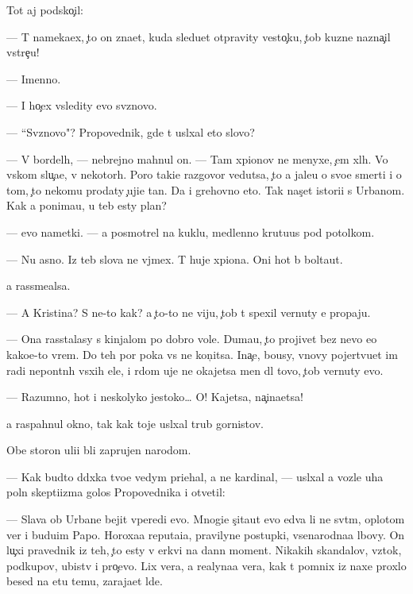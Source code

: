 \documentclass[10pt]{book}
\begin{document}
Tot aj podsko{\c}il:

— T{\yi} nameka{\y}ex, {\c}to on zna{\y}et, kuda sledu{\y}et otpravity vesto{\c}ku, {\c}tob{\yi} kuzne{\q} nazna{\c}il vstre{\c}u!

— Imenno.

— I ho{\c}ex v{\yi}sledity {\y}evo sv{\ia}znovo.

— ``Sv{\ia}znovo"? Propovednik, gde t{\yi} usl{\yi}xal eto slovo?

— V bordel{\ia}h, — nebrejno mahnul on. — Tam xpionov ne menyxe, {\c}em xl{\iu}h. Vo vs{\ia}kom slu{\c}a{\y}e, v nekotor{\yi}h. Poro{\y} taki{\y}e razgovor{\yi} vedutsa, {\c}to {\y}a jale{\y}u o svo{\y}e{\y} smerti i o tom, {\c}to nekomu prodaty {\c}uji{\y}e ta{\y}n{\yi}. Da i grehovno eto. Tak nas{\c}et istori{\y}i s Urbanom. Kak {\y}a ponima{\y}u, u teb{\ia} {\y}esty plan?

— {\Y}evo nametki. — {\Y}a posmotrel na kuklu, medlenno krut{\ia}{\x}u{\y}us{\ia} pod potolkom.

— Nu {\y}asno. Iz teb{\ia} slova ne v{\yi}jmex. T{\yi} huje xpiona. Oni hot{\ia} b{\yi} bolta{\y}ut.

{\Y}a rassme{\y}alsa.

— A Kristina? S ne{\y}-to kak? {\Y}a {\c}to-to ne viju, {\c}tob{\yi} t{\yi} spexil vernuty {\y}e{\y} propaju.

— Ona rasstalasy s kinjalom po dobro{\y} vole. Duma{\y}u, {\c}to projivet bez nevo {\y}e{\x}o kako{\y}e-to vrem{\ia}. Do teh por poka vs{\e} ne kon{\c}itsa. Ina{\c}e, bo{\y}usy, vnovy pojertvu{\y}et im radi nepon{\ia}tn{\yi}h v{\yi}sxih {\q}ele{\y}, i r{\ia}dom uje ne okajetsa men{\ia} dl{\ia} tovo, {\c}tob{\yi} vernuty {\y}evo.

— Razumno, hot{\ia} i neskolyko jestoko… O! Kajetsa, na{\c}ina{\y}etsa!

{\Y}a raspahnul okno, tak kak toje usl{\yi}xal trub{\yi} gornistov.

Obe storon{\yi} uli{\q}i b{\yi}li zaprujen{\yi} narodom.

— Kak budto d{\ia}d{\iu}xka tvo{\y}e{\y} vedym{\yi} pri{\y}ehal, a ne kardinal, — usl{\yi}xal {\y}a vozle uha poln{\yi}{\y} skepti{\q}izma golos Propovednika i otvetil:

— Slava ob Urbane bejit vperedi {\y}evo. Mnogi{\y}e s{\c}ita{\y}ut {\y}evo {\y}edva li ne sv{\ia}t{\yi}m, oplotom ver{\yi} i budu{\x}im Papo{\y}. Horoxa{\y}a reputa{\q}i{\y}a, pravilyn{\yi}{\y}e postupki, vsenarodna{\y}a l{\iu}bovy. On lu{\c}xi{\y} pravednik iz teh, {\c}to {\y}esty v {\Q}erkvi na dann{\yi}{\y} moment. Nikakih skandalov, vz{\ia}tok, podkupov, ubi{\y}stv i pro{\c}evo. Lix vera, a realyna{\y}a vera, kak t{\yi} pomnix iz naxe{\y} proxlo{\y} besed{\yi} na etu temu, zaraja{\y}et l{\iu}de{\y}.
\end{document}
